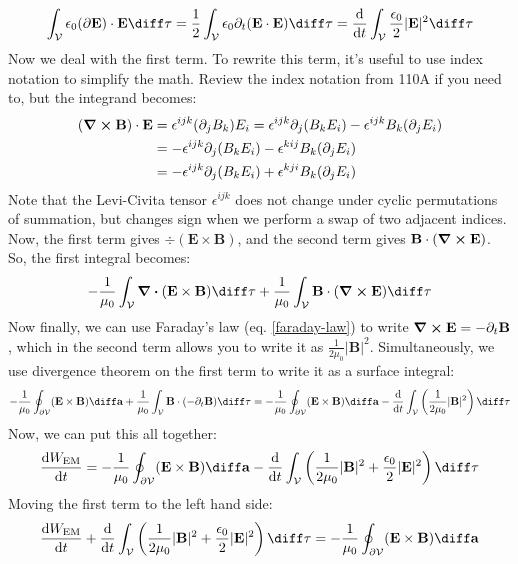 \[
	\int_{\mathcal{V}} \epsilon_0(\partial \mathbf{E}) \cdot \mathbf{E} \diff \tau =
	\frac{1}{2}\int_{\mathcal{V}} \epsilon_0 \partial_t (\mathbf{E} \cdot \mathbf{E}) \diff \tau =
	\dv{t} \int_{\mathcal{V}} \frac{\epsilon_0}{2}  |\mathbf{E}|^2 \diff \tau 
\]
Now we deal with the first term. To rewrite this term, it's useful to use index notation to simplify the
math. Review the index notation from 110A if you need to, but the integrand becomes:
\begin{align*}
	(\curl \mathbf{B}) \cdot \mathbf{E} &= \epsilon^{ijk}(\partial_j B_k) E_i = \epsilon^{ijk} \partial_j (B_k
	E_i) - \epsilon^{ijk}B_k (\partial_j E_i)\\
	&= -\epsilon^{ijk}\partial_j (B_k E_i) - \epsilon^{kij}B_k(\partial_j E_i) \\ 
	&= -\epsilon^{ijk}\partial_j (B_k E_i) + \epsilon^{kji} B_k (\partial_j E_i) 
\end{align*}
Note that the Levi-Civita tensor \( \epsilon^{ijk} \) does not change under cyclic permutations of summation,
but changes sign when we perform a swap of two adjacent indices. Now, the first term gives \( \div(\mathbf{E}
\times \mathbf{B})\), and the second term gives \( \mathbf{B} \cdot (\curl \mathbf{E}) \). So, the first
integral becomes:
\[
	-\frac{1}{\mu_0} \int_{\mathcal{V}} \div(\mathbf{E} \times \mathbf{B}) \diff \tau +
	\frac{1}{\mu_0}\int_{\mathcal{V}} \mathbf{B} \cdot (\curl \mathbf{E}) \diff \tau 
\]
Now finally, we can use Faraday's law (eq. \ref{faraday-law}) to write \( \curl \mathbf{E} = -\partial_t
\mathbf{B} \), which in the second term allows you to write it as \( \frac{1}{2\mu_0}|\mathbf{B}|^2 \).
Simultaneously, we use divergence theorem on the first term to write it as a surface integral:  
\[
	-\frac{1}{\mu_0} \oint_{\partial \mathcal{V}}(\mathbf{E} \times \mathbf{B}) \diff \mathbf{a} +
	\frac{1}{\mu_0} \int_{\mathcal{V}} \mathbf{B} \cdot (-\partial_t \mathbf{B}) \diff \tau =
	-\frac{1}{\mu_0}\oint_{\partial \mathcal{ V}}(\mathbf{E} \times \mathbf{B}) \diff \mathbf{a} - \dv{t}
	\int_{\mathcal{V}}\left( \frac{1}{2\mu_0} |\mathbf{B}|^2\right) \diff \tau 
\]
Now, we can put this all together:
\[
	\dv{W_\text{EM}}{t} = -\frac{1}{\mu_0} \oint_{\partial \mathcal{V}} (\mathbf{E} \times \mathbf{B}) \diff
	\mathbf{a} - \dv{t} \int_{\mathcal{V}}\left( \frac{1}{2\mu_0}|\mathbf{B}|^2 +
	\frac{\epsilon_0}{2}|\mathbf{E}|^2 \right) \diff \tau 
\]
Moving the first term to the left hand side:
\begin{equation}
	\label{poynting-thm}
	\dv{W_\text{EM}}{t} + \dv{t} \int_{\mathcal{V}}\left( \frac{1}{2\mu_0}|\mathbf{B}|^2 +
	\frac{\epsilon_0}{2}|\mathbf{E}|^2 \right)\diff \tau = -\frac{1}{\mu_0}\oint_{\partial
\mathcal{V}}(\mathbf{E} \times \mathbf{B}) \diff \mathbf{a}
\end{equation}
